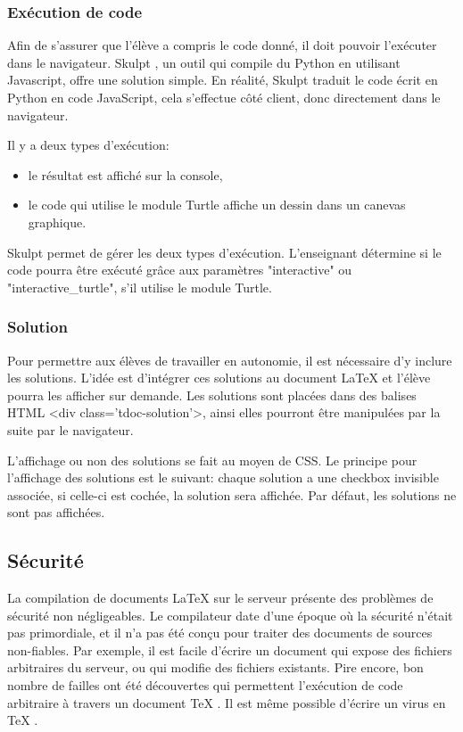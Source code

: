 \documentclass[12pt,titlepage,oneside]{article}
\renewcommand{\cite}[1]{}
\begin{document}
\subsubsection{Exécution de code}
Afin de s'assurer que l'élève a compris le code donné, il doit pouvoir l'exécuter dans le navigateur. Skulpt \cite{skulpt}, un outil qui compile du Python en utilisant Javascript, offre une solution simple. En réalité, Skulpt traduit le code écrit en Python en code JavaScript, cela s'effectue côté client, donc directement dans le navigateur. \par
Il y a deux types d'exécution:
\begin{itemize}
\item le résultat est affiché sur la console,
\item le code qui utilise le module Turtle affiche un dessin dans un canevas graphique.
\end{itemize}
Skulpt permet de gérer les deux types d'exécution. L'enseignant détermine si le code pourra être exécuté grâce aux paramètres "interactive" ou "interactive\_turtle", s'il utilise le module Turtle.\par

\newpage
\subsubsection{Solution}
Pour permettre aux élèves de travailler en autonomie, il est nécessaire d'y inclure les solutions. L'idée est d'intégrer ces solutions au document LaTeX et l'élève pourra les afficher sur demande. Les solutions sont placées dans des balises HTML <div class='tdoc-solution'>, ainsi elles pourront être manipulées par la suite par le navigateur.\par

L'affichage ou non des solutions se fait au moyen de CSS. Le principe pour l'affichage des solutions est le suivant: chaque solution a une checkbox invisible associée, si celle-ci est cochée, la solution sera affichée. Par défaut, les solutions ne sont pas affichées.\par

\subsection{Sécurité}
La compilation de documents LaTeX sur le serveur présente des problèmes de sécurité non négligeables. Le compilateur date d'une époque où la sécurité n'était pas primordiale, et il n'a pas été conçu pour traiter des documents de sources non-fiables. Par exemple, il est facile d'écrire un document qui expose des fichiers arbitraires du serveur, ou qui modifie des fichiers existants. Pire encore, bon nombre de failles ont été découvertes qui permettent l'exécution de code arbitraire à travers un document TeX \cite{cve2016} \cite{cve2018}. Il est même possible d'écrire un virus en TeX \cite{usenix}.\par
\end{document}
